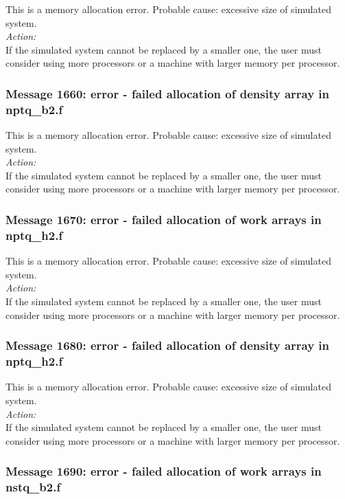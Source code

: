 This is a memory allocation error. Probable cause: excessive size of
simulated system. \\

\noindent
{\em Action:}\\
If the simulated system cannot be replaced by a smaller one, the user
must consider using more processors or a machine with larger memory
per processor.

\subsubsection*{Message 1660: error - failed allocation of density
array in nptq\_b2.f}

This is a memory allocation error. Probable cause: excessive size of
simulated system. \\

\noindent
{\em Action:}\\
If the simulated system cannot be replaced by a smaller one, the user
must consider using more processors or a machine with larger memory
per processor.

\subsubsection*{Message 1670: error - failed allocation of work arrays
in nptq\_h2.f}

This is a memory allocation error. Probable cause: excessive size of
simulated system. \\

\noindent
{\em Action:}\\
If the simulated system cannot be replaced by a smaller one, the user
must consider using more processors or a machine with larger memory
per processor.

\subsubsection*{Message 1680: error - failed allocation of density
array in nptq\_h2.f}

This is a memory allocation error. Probable cause: excessive size of
simulated system. \\

\noindent
{\em Action:}\\
If the simulated system cannot be replaced by a smaller one, the user
must consider using more processors or a machine with larger memory
per processor.

\subsubsection*{Message 1690: error - failed allocation of work arrays
in nstq\_b2.f}


